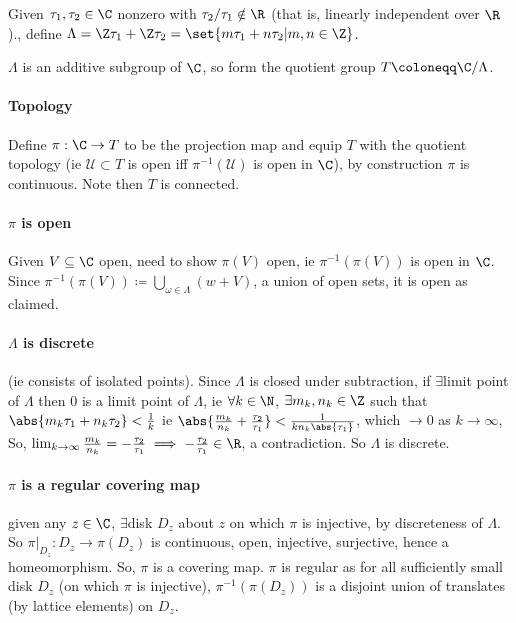 \documentclass{article}
\begin{document}
Given $\tau_1, \tau_2 \in \C$ nonzero with $\tau_2 / \tau_1 \notin \R$ (that is, linearly independent over $\R$)., define $\Lambda = \Z \tau_1 + \Z \tau_2 = \set{m \tau_1 + n \tau_2 | m, n \in \Z }$.

$\Lambda$ is an additive subgroup of $\C$, so form the quotient group $T \coloneqq \C / \Lambda$.

\paragraph{Topology} Define $\pi: \C \to T$ to be the projection map and equip $T$ with the quotient topology (ie $\mathcal{U} \subset T$ is open iff $\pi^{-1}(\mathcal{U})$ is open in $\C$), by construction $\pi$ is continuous. Note then $T$ is connected.

\paragraph{$\pi$ is open} Given $V \subseteq \C$ open, need to show $\pi(V)$ open, ie $\pi^{-1}(\pi(V))$ is open in $\C$. Since $\pi^{-1}(\pi(V)) \coloneqq \bigcup_{\omega \in \Lambda} (w + V)$, a union of open sets, it is open as claimed.

\paragraph{$\Lambda$ is discrete} (ie consists of isolated points). Since $\Lambda$ is closed under subtraction, if $\exists$limit point of $\Lambda$ then $0$ is a limit point of $\Lambda$, ie $\forall k \in \N$, $\exists m_k, n_k \in \Z$ such that $\abs{m_k \tau_1 + n_k \tau_2} < \frac{1}{k}$ ie $\abs{\frac{m_k}{n_k} + \frac{\tau_2}{\tau_1}} < \frac{1}{k n_k \abs{\tau_1}}$, which $\to 0$ as $k \to \infty$,
So, $\lim_{k \to \infty} \frac{m_k}{n_k} = -\frac{\tau_2}{\tau_1} \implies -\frac{\tau_2}{\tau_1} \in \R$, a contradiction. So $\Lambda$ is discrete.

\paragraph{$\pi$ is a regular covering map} given any $z \in \C$, $\exists$disk $D_z$ about $z$ on which $\pi$ is injective, by discreteness of $\Lambda$.  So $\pi|_{D_z}: D_z \to \pi(D_z)$ is continuous, open, injective, surjective, hence a homeomorphism.
So, $\pi$ is a covering map. $\pi$ is regular as for all sufficiently small disk $D_z$ (on which $\pi$ is injective), $\pi^{-1}(\pi(D_z))$ is a disjoint union of translates (by lattice elements) on $D_z$.
\end{document}
